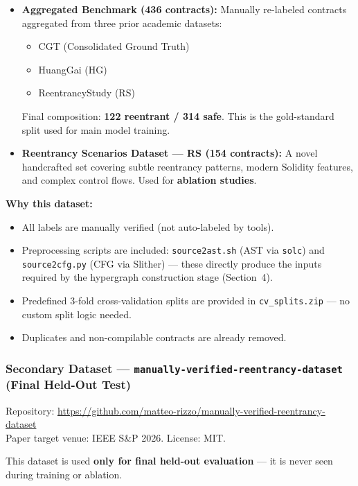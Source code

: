 \documentclass[11pt]{article}
\begin{document}
\begin{itemize}
    \item \textbf{Aggregated Benchmark (436 contracts):} Manually re-labeled contracts aggregated from three prior academic datasets:
    \begin{itemize}
        \item CGT (Consolidated Ground Truth)
        \item HuangGai (HG)
        \item ReentrancyStudy (RS)
    \end{itemize}
    Final composition: \textbf{122 reentrant / 314 safe}. This is the gold-standard split used for main model training.

    \item \textbf{Reentrancy Scenarios Dataset --- RS (154 contracts):} A novel handcrafted set covering subtle reentrancy patterns, modern Solidity features, and complex control flows. Used for \textbf{ablation studies}.
\end{itemize}

\textbf{Why this dataset:}
\begin{itemize}
    \item All labels are manually verified (not auto-labeled by tools).
    \item Preprocessing scripts are included: \texttt{source2ast.sh} (AST via \texttt{solc}) and \texttt{source2cfg.py} (CFG via Slither) --- these directly produce the inputs required by the hypergraph construction stage (Section~4).
    \item Predefined 3-fold cross-validation splits are provided in \texttt{cv\_splits.zip} --- no custom split logic needed.
    \item Duplicates and non-compilable contracts are already removed.
\end{itemize}

\subsubsection{Secondary Dataset --- \texttt{manually-verified-reentrancy-dataset} (Final Held-Out Test)}

Repository: \url{https://github.com/matteo-rizzo/manually-verified-reentrancy-dataset}\\
Paper target venue: IEEE S\&P 2026. License: MIT.

This dataset is used \textbf{only for final held-out evaluation} --- it is never seen during training or ablation.
\end{document}
